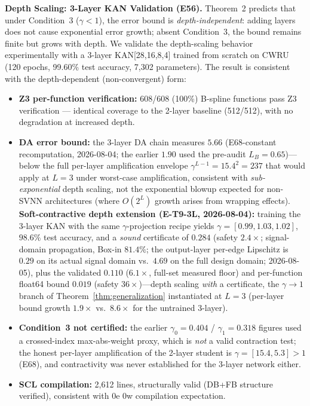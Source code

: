 \documentclass[journal,onecolumn]{IEEEtran}
\begin{document}
\vspace{4pt}
\noindent\textbf{Depth Scaling: 3-Layer KAN Validation (E56).}
Theorem~2 predicts that under Condition~3 ($\gamma<1$), the error bound is
\textit{depth-independent}: adding layers does not cause exponential
error growth; absent Condition~3, the bound remains finite but grows
with depth. We validate the depth-scaling behavior experimentally with a
3-layer KAN[28,16,8,4]
trained from scratch on CWRU (120 epochs, 99.60\% test accuracy, 7,302 parameters).
The result is consistent with the depth-dependent (non-convergent) form:
\begin{itemize}
    \item \textbf{Z3 per-function verification:} 608/608 (100\%) B-spline
         functions pass Z3 verification — identical coverage to the 2-layer
         baseline (512/512), with no degradation at increased depth.
    \item \textbf{DA error bound:} the 3-layer DA chain measures
          $5.66$ (E68-constant recomputation, 2026-08-04; the earlier
          $1.90$ used the pre-audit $L_B = 0.65$)---below the full
          per-layer amplification envelope $\gamma^{L-1} = 15.4^2 = 237$
          that would apply at $L = 3$ under worst-case amplification,
          consistent with \emph{sub-exponential} depth scaling, not the
          exponential blowup expected for non-SVNN architectures (where
          $O(2^L)$ growth arises from wrapping effects).
          \textbf{Soft-contractive depth extension (E-T9-3L, 2026-08-04):}
          training the 3-layer KAN with the same $\gamma$-projection recipe
          yields $\gamma = [0.99, 1.03, 1.02]$, $98.6\%$ test accuracy, and a
          \emph{sound} certificate of $0.284$ (safety $2.4\times$;
          signal-domain propagation, Box-in $81.4\%$; the output-layer
          per-edge Lipschitz is $0.29$ on its actual signal domain vs.\
          $4.69$ on the full design domain; 2026-08-05), plus the
          validated $0.110$ ($6.1\times$, full-set measured floor) and
          per-function float64 bound $0.019$ (safety $36\times$)---depth scaling
          \emph{with} a certificate, the $\gamma \to 1$ branch of
          Theorem~\ref{thm:generalization} instantiated at $L = 3$
          (per-layer bound growth $1.9\times$ vs.\ $8.6\times$ for the
          untrained 3-layer).
    \item \textbf{Condition~3 not certified:} the earlier $\gamma_0 = 0.404$ /
         $\gamma_1 = 0.318$ figures used a crossed-index max-abs-weight
         proxy, which is \emph{not} a valid contraction test; the honest
         per-layer amplification of the 2-layer student is
         $\gamma = [15.4, 5.3] > 1$ (E68), and contractivity was never
         established for the 3-layer network either.
    \item \textbf{SCL compilation:} 2,612 lines, structurally valid (DB+FB
         structure verified), consistent with 0e 0w compilation expectation.
\end{itemize}
\end{document}
